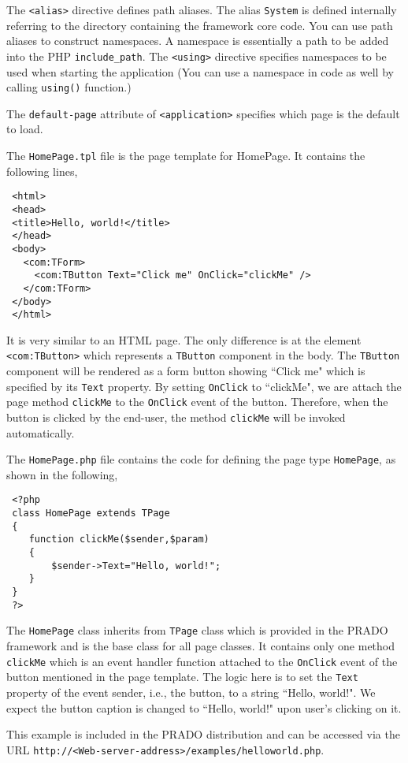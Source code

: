\documentclass{book}
\begin{document}
The \verb|<alias>| directive defines path aliases. The alias
\verb|System| is defined internally referring to the directory
containing the framework core code. You can use path aliases to
construct namespaces. A namespace is essentially a path to be
added into the PHP \verb|include_path|. The \verb|<using>|
directive specifies namespaces to be used when starting the
application (You can use a namespace in code as well by calling
\verb|using()| function.)

The \verb|default-page| attribute of \verb|<application>|
specifies which page is the default to load.


The \verb|HomePage.tpl| file is the page template for HomePage. It
contains the following lines,
\begin{verbatim}
 <html>
 <head>
 <title>Hello, world!</title>
 </head>
 <body>
   <com:TForm>
     <com:TButton Text="Click me" OnClick="clickMe" />
   </com:TForm>
 </body>
 </html>
\end{verbatim}
It is very similar to an HTML page. The only difference is at the
element \verb|<com:TButton>| which represents a \verb|TButton|
component in the body. The \verb|TButton| component will be
rendered as a form button showing ``Click me" which is specified
by its \verb|Text| property. By setting \verb|OnClick| to
``clickMe", we are attach the page method \verb|clickMe| to the
\verb|OnClick| event of the button. Therefore, when the button is
clicked by the end-user, the method \verb|clickMe| will be invoked
automatically.


The \verb|HomePage.php| file contains the code for defining the
page type \verb|HomePage|, as shown in the following,
\begin{verbatim}
 <?php
 class HomePage extends TPage
 {
    function clickMe($sender,$param)
    {
        $sender->Text="Hello, world!";
    }
 }
 ?>
\end{verbatim}

The \verb|HomePage| class inherits from \verb|TPage| class which
is provided in the PRADO framework and is the base class for all
page classes. It contains only one method \verb|clickMe| which is
an event handler function attached to the \verb|OnClick| event of
the button mentioned in the page template. The logic here is to
set the \verb|Text| property of the event sender, i.e., the
button, to a string ``Hello, world!". We expect the button caption
is changed to ``Hello, world!" upon user's clicking on it.

This example is included in the PRADO distribution and can be
accessed via the URL
\verb|http://<Web-server-address>/examples/helloworld.php|.
\end{document}
